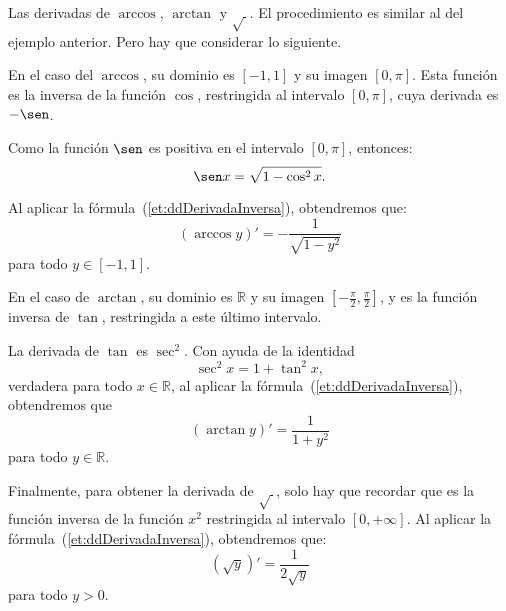 \begin{exemplo}[Solución]{%
Las derivadas de $\arccos$, $\arctan$ y $\sqrt{ \ }$.
}%
El procedimiento es similar al del ejemplo anterior. Pero hay que considerar lo siguiente.

En el caso del $\arccos$, su dominio es $[-1,1]$ y su imagen $[0,\pi]$. Esta función es la inversa
de la función $\cos$, restringida al intervalo $[0,\pi]$, cuya derivada es $-\sen$.

Como la función $\sen$ es positiva en el intervalo $[0,\pi]$, entonces:
\[
\sen x = \sqrt{1 - \cos^2 x}.
\]

Al aplicar la fórmula~(\ref{et:ddDerivadaInversa}), obtendremos que:
\[
(\arccos y)' = -\frac{1}{\sqrt{1 - y^2}}
\]
para todo $y\in [-1,1]$.

En el caso de $\arctan$, su dominio es $\mathbb{R}$ y su imagen $[-\frac{\pi}{2},\frac{\pi}{2}]$, y
es la función inversa de $\tan$, restringida a este último intervalo.

La derivada de $\tan$ es $\sec^2$. Con ayuda de la identidad
\[
\sec^2 x = 1 + \tan^2 x,
\]
verdadera para todo $x\in\mathbb{R}$, al aplicar la fórmula~(\ref{et:ddDerivadaInversa}),
obtendremos que
\[
(\arctan y)' = \frac{1}{1 + y^2}
\]
para todo $y\in\mathbb{R}$.

Finalmente, para obtener la derivada de $\sqrt{ \ }$, solo hay que recordar que es la función
inversa de la función $x^2$ restringida al intervalo $[0,+\infty]$. Al aplicar la
fórmula~(\ref{et:ddDerivadaInversa}), obtendremos que:
\[
(\sqrt{y})' = \frac{1}{2\sqrt{y}}
\]
para todo $y > 0$.
\end{exemplo}

